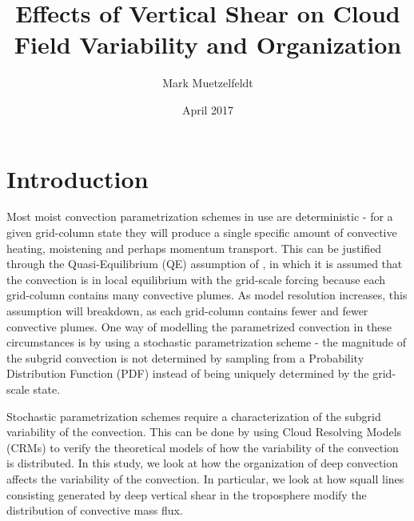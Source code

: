 \documentclass[11pt,a4paper]{article}
\title{Effects of Vertical Shear on Cloud Field Variability and Organization }
\author{Mark Muetzelfeldt}
\date{April 2017}
\begin{document}
\maketitle
\section{Introduction}


Most moist convection parametrization schemes in use are deterministic - for a given grid-column state they will produce a single specific amount of convective heating, moistening and perhaps momentum transport. This can be justified through the Quasi-Equilibrium (QE) assumption of \cite{arakawa1974}, in which it is assumed that the convection is in local equilibrium with the grid-scale forcing because each grid-column contains many convective plumes. As model resolution increases, this assumption will breakdown, as each grid-column contains fewer and fewer convective plumes. One way of modelling the parametrized convection in these circumstances is by using a stochastic parametrization scheme - the magnitude of the subgrid convection is not determined by sampling from a Probability Distribution Function (PDF) instead of being uniquely determined by the grid-scale state.

Stochastic parametrization schemes require a characterization of the subgrid variability of the convection. This can be done by using Cloud Resolving Models (CRMs) to verify the theoretical models of how the variability of the convection is distributed. In this study, we look at how the organization of deep convection affects the variability of the convection. In particular, we look at how squall lines consisting generated by deep vertical shear in the troposphere modify the distribution of convective mass flux.
\end{document}
